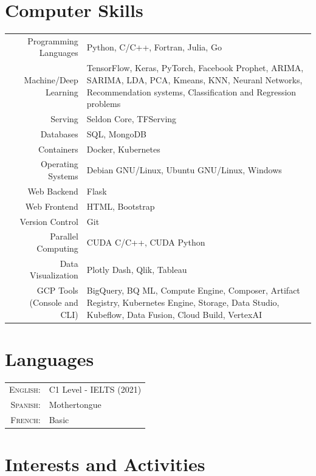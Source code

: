 \documentclass[a4paper,10pt]{article} %
\begin{document}
\section{Computer Skills}
\bigskip
\begin{tabular}{r|p{10.5cm}}
	Programming Languages & Python, C/C++, Fortran, Julia, Go \\
	Machine/Deep Learning & TensorFlow, Keras, PyTorch, Facebook Prophet, ARIMA, SARIMA, LDA, PCA, Kmeans, KNN, Neuranl Networks, Recommendation systems, Classification and Regression problems\\
	Serving & Seldon Core, TFServing \\
	Databases & SQL, MongoDB \\
	Containers & Docker, Kubernetes \\
	Operating Systems & Debian GNU/Linux, Ubuntu GNU/Linux, Windows \\
	Web Backend & Flask \\
	Web Frontend & HTML, Bootstrap \\
	Version Control & Git \\
	Parallel Computing & CUDA C/C++, CUDA Python\\
	Data Visualization & Plotly Dash, Qlik, Tableau \\
	GCP Tools (Console and CLI) & BigQuery, BQ ML, Compute Engine, Composer, Artifact Registry, Kubernetes Engine, Storage, Data Studio, Kubeflow, Data Fusion, Cloud Build, VertexAI
\end{tabular}

\section{Languages}
\bigskip
\begin{tabular}{rl}
	\textsc{English:} & C1 Level - IELTS (2021)\\
	\textsc{Spanish:} & Mothertongue \\
	\textsc{French:} & Basic
\end{tabular}

\bigskip
\section{Interests and Activities}
\bigskip
\end{document}
